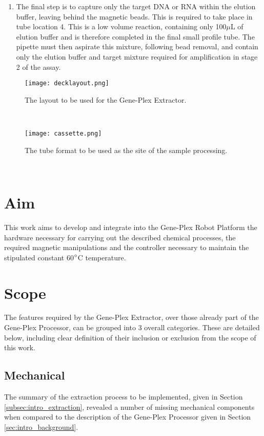\begin{enumerate}
	\item The final step is to capture only the target DNA or RNA within the elution buffer, leaving behind the magnetic beads. This is required to take place in tube location 4. This is a low volume reaction, containing only 100$\mu$L of elution buffer and is therefore completed in the final small profile tube. The pipette must then aspirate this mixture, following bead removal, and contain only the elution buffer and target mixture required for amplification in stage 2 of the assay.
\end{enumerate}

\begin{figure}
	\centering
	\texttt{[image: decklayout.png]}
	\caption[Extractor deck layout.]{The layout to be used for the Gene-Plex Extractor.}
	\label{fig:decklayout}
\end{figure} 

\begin{figure}
	\centering
	\texttt{[image: cassette.png]}
	\caption[Extraction cassette tubes.]{The tube format to be used as the site of the sample processing.}
	\label{fig:cassette}
\end{figure} 


\section{Aim}
\label{sec:intro_aim}
This work aims to develop and integrate into the Gene-Plex Robot Platform the hardware necessary for carrying out the described chemical processes, the required magnetic manipulations and the controller necessary to maintain the stipulated constant 60$\degree$C temperature.\\

\section{Scope}
\label{sec:intro_scope}
The features required by the Gene-Plex Extractor, over those already part of the Gene-Plex Processor, can be grouped into 3 overall categories. These are detailed below, including clear definition of their inclusion or exclusion from the scope of this work.\\

\subsection{Mechanical}
\label{sec:intro_mechanical}
The summary of the extraction process to be implemented, given in Section \ref{subsec:intro_extraction}, revealed a number of missing mechanical components when compared to the description of the Gene-Plex Processor given in Section \ref{sec:intro_background}. 

